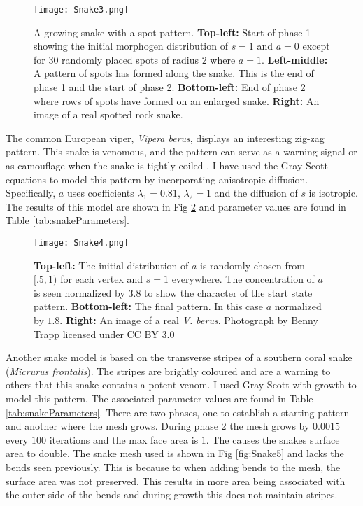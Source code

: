 \begin{figure}[ht]
	\centering
	\texttt{[image: Snake3.png]}
	\caption{A growing snake with a spot pattern. \textbf{Top-left:} Start of phase 1 showing the initial morphogen distribution of $s=1$ and $a=0$ except for 30 randomly placed spots of radius 2 where $a=1$. \textbf{Left-middle:} A pattern of spots has formed along the snake. This is the end of phase 1 and the start of phase 2. \textbf{Bottom-left:} End of phase 2 where rows of spots have formed on an enlarged snake. \textbf{Right:} An image of a real spotted rock snake.}
	\label{fig:Snake3}
\end{figure}

The common European viper, \textit{Vipera berus}, displays an interesting zig-zag pattern. This snake is venomous,   and the pattern can serve as a warning signal or as camouflage when the snake is tightly coiled \cite{lillywhite2014}. I have used the Gray-Scott equations to model this pattern by incorporating anisotropic diffusion. Specifically, $a$ uses coefficients $\lambda_{1}=0.81$, $\lambda_{2}=1$ and the diffusion of $s$ is isotropic. The results of this model are shown in Fig \ref{fig:Snake4} and parameter values are found in Table \ref{tab:snakeParameters}.

\newpage 

\begin{figure}[ht]
	\centering
	\texttt{[image: Snake4.png]}
	\caption{\textbf{Top-left:} The initial distribution of $a$ is randomly chosen from $[.5, 1)$ for each vertex and $s=1$ everywhere. The concentration of $a$ is seen normalized by 3.8 to show the character of the start state pattern. \textbf{Bottom-left:} The final pattern. In this case $a$ normalized by $1.8$. \textbf{Right:} An image of a real \textit{V. berus}. Photograph by Benny Trapp licensed under CC BY 3.0}
	\label{fig:Snake4}
\end{figure}

Another snake model is based on the transverse stripes of a southern coral snake (\textit{Micrurus frontalis}). The stripes are brightly coloured and are a warning to others that this snake contains a potent venom. I used Gray-Scott with growth to model this pattern. The associated parameter values are found in Table \ref{tab:snakeParameters}. There are two phases, one to establish a starting pattern and another where the mesh grows. During phase 2 the mesh grows by $0.0015$ every $100$ iterations and the max face area is $1$. The causes the snakes surface area to double. The snake mesh used is shown in Fig \ref{fig:Snake5} and lacks the bends seen previously. This is because to when adding bends to the mesh, the surface area was not preserved. This results in more area being associated with the outer side of the bends and during growth this does not maintain stripes.

